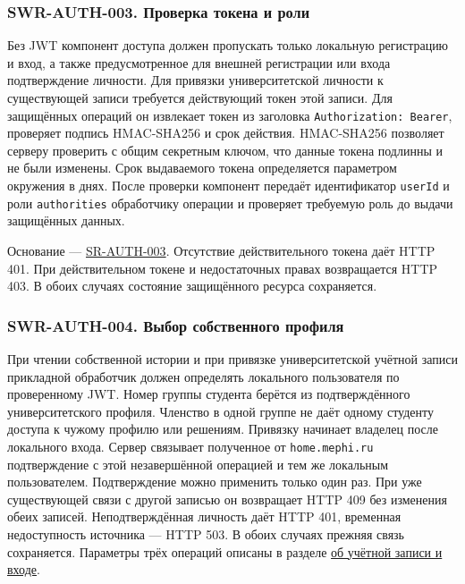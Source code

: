 \documentclass[12pt,a4paper]{article}
\begin{document}
\subsubsection{SWR-AUTH-003. Проверка токена и роли}\label{swr-auth-003-ux43fux440ux43eux432ux435ux440ux43aux430-ux442ux43eux43aux435ux43dux430-ux438-ux440ux43eux43bux438}

\hypertarget{swr-auth-003-проверка-токена-и-роли}{}

\hypertarget{swr-auth-003}{}

Без JWT компонент доступа должен пропускать только локальную регистрацию и вход, а также предусмотренное для внешней регистрации или входа подтверждение личности. Для привязки университетской личности к существующей записи требуется действующий токен этой записи. Для защищённых операций он извлекает токен из заголовка \texttt{Authorization:\ Bearer}, проверяет подпись HMAC-SHA256 и срок действия. HMAC-SHA256 позволяет серверу проверить с общим секретным ключом, что данные токена подлинны и не были изменены. Срок выдаваемого токена определяется параметром окружения в днях. После проверки компонент передаёт идентификатор \texttt{userId} и роли \texttt{authorities} обработчику операции и проверяет требуемую роль до выдачи защищённых данных.

Основание --- {\href{../04\_Системные\_требования/DOC-05\_Системные\_требования.pdf\#sr-auth-003}{SR-AUTH-003}}. Отсутствие действительного токена даёт HTTP 401. При действительном токене и недостаточных правах возвращается HTTP 403. В обоих случаях состояние защищённого ресурса сохраняется.

\subsubsection{SWR-AUTH-004. Выбор собственного профиля}\label{swr-auth-004-ux432ux44bux431ux43eux440-ux441ux43eux431ux441ux442ux432ux435ux43dux43dux43eux433ux43e-ux43fux440ux43eux444ux438ux43bux44f}

\hypertarget{swr-auth-004-выбор-собственного-профиля}{}

\hypertarget{swr-auth-004}{}

При чтении собственной истории и при привязке университетской учётной записи прикладной обработчик должен определять локального пользователя по проверенному JWT. Номер группы студента берётся из подтверждённого университетского профиля. Членство в одной группе не даёт одному студенту доступа к чужому профилю или решениям. Привязку начинает владелец после локального входа. Сервер связывает полученное от \texttt{home.\allowbreak{}mephi.\allowbreak{}ru} подтверждение с этой незавершённой операцией и тем же локальным пользователем. Подтверждение можно применить только один раз. При уже существующей связи с другой записью он возвращает HTTP 409 без изменения обеих записей. Неподтверждённая личность даёт HTTP 401, временная недоступность источника --- HTTP 503. В обоих случаях прежняя связь сохраняется. Параметры трёх операций описаны в разделе {\href{../09\_Архитектура\_и\_API/DOC-08\_Справочник\_API.pdf\#учётная-запись-и-вход}{об учётной записи и входе}}.
\end{document}

